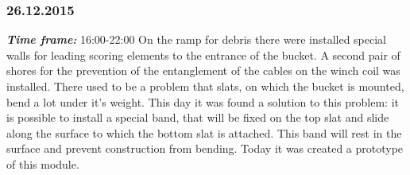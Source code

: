 \subsubsection{26.12.2015}
\textit{\textbf{Time frame:}} 16:00-22:00 \newline
On the ramp for debris there were installed special walls for leading scoring elements to the entrance of the bucket.
A second pair of shores for the prevention of the entanglement of the cables on the winch coil was installed.
There used to be a problem that slats, on which the bucket is mounted, bend a lot under it's weight. This day it was found a solution to this problem: it is possible to install a special band, that will be fixed on the top slat and slide along the surface to which the bottom slat is attached. This band will rest in the surface and prevent construction from bending.
Today it was created a prototype of this module.

